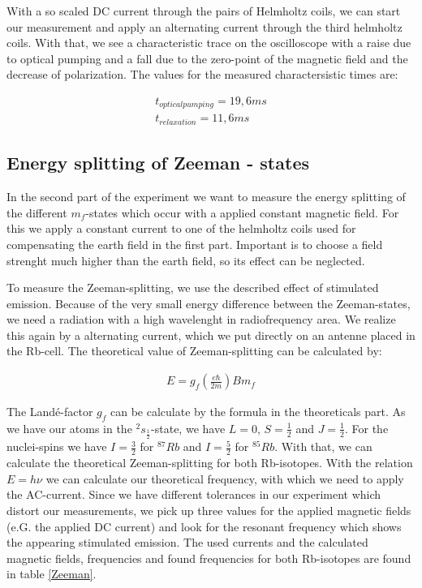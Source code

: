With a so scaled DC current through the pairs of Helmholtz coils, we can start our measurement and apply an alternating current through the third helmholtz coils. With that, we see a characteristic trace on the oscilloscope with a raise due to optical pumping and a fall due to the zero-point of the magnetic field and the decrease of polarization. The values for the measured charactersistic times are:

\begin{align}
t_{optical pumping} = 19,6 ms \\
t_{relaxation} = 11,6 ms
\end{align}

\subsection{Energy splitting of Zeeman - states}

In the second part of the experiment we want to measure the energy splitting of the  different $m_f$-states which occur with a applied constant magnetic field. For this we apply a constant current to one of the helmholtz coils used for compensating the earth field in the first part. Important is to choose a field strenght much higher than the earth field, so its effect can be neglected.

To measure the Zeeman-splitting, we use the described effect of stimulated emission. Because of the very small energy difference between the Zeeman-states, we need a radiation with a high wavelenght in radiofrequency area. We realize this again by a alternating current, which we put directly on an antenne placed in the Rb-cell. The theoretical value of Zeeman-splitting can be calculated by:

\begin{align}
E = g_f\left(\frac{e\hbar}{2m}\right)Bm_f
\end{align}

The Landé-factor $g_f$ can be calculate by the formula in the theoreticals part. As we have our atoms in the $^{2}s_{\frac{1}{2}}$-state, we have $L=0$, $S=\frac{1}{2}$ and $J=\frac{1}{2}$. For the nuclei-spins we have $I=\frac{3}{2}$ for $^{87}Rb$ and $I=\frac{5}{2}$ for $^{85}Rb$. With that, we can calculate the theoretical Zeeman-splitting for both Rb-isotopes. With the relation $E=h\nu$ we can calculate our theoretical frequency, with which we need to apply the AC-current. Since we have different tolerances in our experiment which distort our measurements, we pick up three values for the applied magnetic fields (e.G. the applied DC current) and look for the resonant frequency which shows the appearing stimulated emission. The used currents and the calculated magnetic fields, frequencies and found frequencies for both Rb-isotopes are found in table \ref{Zeeman}.

